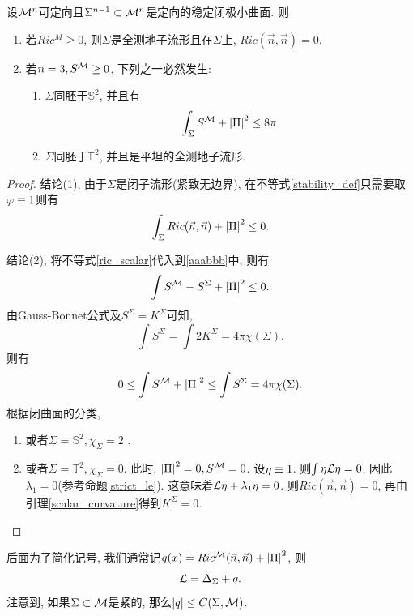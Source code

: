 \begin{corollary}
    设${\mathcal{M}}^n$可定向且$\Sigma^{n-1} \subset {\mathcal{M}}^n$是定向的稳定闭极小曲面. 则
    \begin{enumerate}
        \item 若$Ric^M \ge 0$, 则$\Sigma$是全测地子流形且在$\Sigma$上, $Ric(\vec{n},\vec{n})=0$.
        \item 若$n=3, S^{\mathcal{M}} \ge 0$, 下列之一必然发生:
        \begin{enumerate}
            \item $\Sigma$同胚于$\mathbb{S}^2$, 并且有
            \begin{equation}
                \int_\Sigma S^{\mathcal{M}}+\left | {\Pi} \right |^2 \le 8\pi
            \end{equation}
            \item $\Sigma$同胚于$\mathbb{T}^2$, 并且是平坦的全测地子流形.
        \end{enumerate}
    \end{enumerate}
\end{corollary}
\begin{proof}
    结论(1), 由于$\Sigma$是闭子流形(紧致无边界), 在不等式\eqref{stability_def}只需要取$\varphi\equiv 1$则有
    \begin{equation} \label{aaabbb}
        \int_\Sigma Ric(\vec{n},\vec{n})+\left | {\Pi} \right |^2 \le 0.
    \end{equation}
    \par 结论(2), 将不等式\eqref{ric_scalar}代入到\eqref{aaabbb}中, 则有
    \begin{equation}
        \int S^{\mathcal{M}}- S^\Sigma + \left | {\Pi} \right |^2 \le 0.
    \end{equation}
    由Gauss-Bonnet公式及$S^\Sigma=K^\Sigma$可知,
    \begin{equation}
        \int S^\Sigma = \int 2K^\Sigma = 4\pi \chi(\Sigma).
    \end{equation}
    则有
    \begin{equation}
        0 \le \int S^{\mathcal{M}} + \left | {\Pi} \right |^2 \le \int S^\Sigma = 4\pi\chi(\Sigma).
    \end{equation}
    根据闭曲面的分类, 
    \begin{enumerate}
        \item 或者$\Sigma=\mathbb{S}^2, \chi_{\Sigma}=2$ .
        \item 或者$\Sigma=\mathbb{T}^2, \chi_{\Sigma}=0$. 此时, $\left | {\Pi} \right |^2=0, S^{\mathcal{M}}=0$. 设$\eta\equiv 1$. 则$\int \eta\mathcal{L} \eta=0$, 因此$\lambda_1=0$(参考命题\eqref{strict_le}). 这意味着$\mathcal{L} \eta +\lambda_1\eta=0$. 则$Ric(\vec{n},\vec{n})=0$, 再由引理\eqref{scalar_curvature}得到$K^\Sigma=0$.
    \end{enumerate}
\end{proof}
后面为了简化记号, 我们通常记$q(x)=Ric^{\mathcal{M}}(\vec{n},\vec{n})+\left | {\Pi} \right |^2$, 则 
\begin{equation}
    \mathcal{L}=\Delta_\Sigma+q.
\end{equation}
注意到, 如果$\Sigma \subset {\mathcal{M}}$是紧的, 那么$\left | q \right | \le C(\Sigma, {\mathcal{M}})$. 

